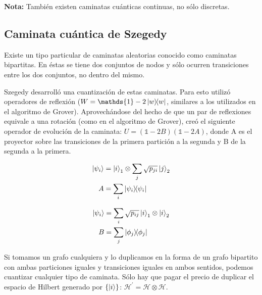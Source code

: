 \documentclass[11pt, spanish]{report}
\begin{document}
\textbf{Nota:} También existen caminatas cuánticas continuas, no sólo discretas.

\subsection{Caminata cuántica de Szegedy}

Existe un tipo particular de caminatas aleatorias conocido como caminatas
bipartitas. En éstas se tiene dos conjuntos de nodos y sólo ocurren transiciones
entre los dos conjuntos, no dentro del mismo.


Szegedy desarrolló una cuantización de estas caminatas. Para esto utilizó
operadores de reflexión ($W = \mathds{1} - 2 \ketbra{w}{w}$, similares a los
utilizados en el algoritmo de Grover). Aprovechándose del hecho de que un par de
reflexiones equivale a una rotación (como en el algoritmo de Grover), creó el
siguiente operador de evolución de la caminata: $U = (\mathds{1} - 2
B)(\mathds{1} - 2 A)$, donde A es el proyector sobre las transiciones de la
primera partición a la segunda y B de la segunda a la primera.

\begin{minipage}{0.5\linewidth}
\begin{align*}
\ket{\psi_i} &= \ket{i}_1 \otimes \sum\limits_j \sqrt{p_{j i}} \ket{j}_2 \\
A &= \sum\limits_i \ketbra{\psi_i}{\psi_i}
\end{align*}
\end{minipage}
\begin{minipage}{0.5\linewidth}
\begin{align*}
\ket{\psi_i} &= \sum\limits_i \sqrt{p_{i j}} \ket{i}_1 \otimes \ket{i}_2 \\
B &= \sum\limits_j \ketbra{\phi_j}{\phi_j}
\end{align*}
\end{minipage}

Si tomamos un grafo cualquiera y lo duplicamos en la forma de un grafo bipartito
con ambas particiones iguales y transiciones iguales en ambos sentidos, podemos
cuantizar cualquier tipo de caminata. Sólo hay que pagar el precio de duplicar
el espacio de Hilbert generado por $\{\ket{i}\}$: $\mathcal{H}^\prime = \mathcal{H} \otimes \mathcal{H}$.
\end{document}
